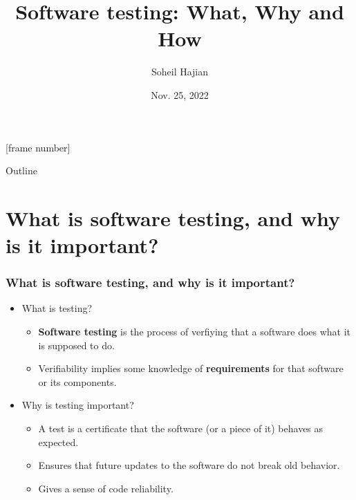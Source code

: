 \documentclass[9pt,xcolor=dvipsnames]{beamer}
\begin{document}
%
\date{Nov. 25, 2022}

\author[S. Hajian]{
	{Soheil Hajian}
	}
%

[frame number]
%
\title[]{Software testing: What, Why and How}

%
%
%
\begin{frame}[plain]

\begin{titlepage}
\end{titlepage}
\vfill
\end{frame}

\begin{frame}{Outline}
    \tableofcontents
\end{frame}
%

\section{What is software testing, and why is it important?}
\begin{frame}
  \frametitle{What is software testing, and why is it important?}
  \begin{itemize}
  \item What is testing?
    \begin{itemize}
    \item \textbf{Software testing} is the process of verfiying that a
      software does what it is supposed to do.
    \item Verifiability implies some knowledge of \textbf{requirements} for that software
      or its components.
    \end{itemize}
    \pause 
  \item Why is testing important?
    \begin{itemize}
      \item A test is a certificate that the software (or a piece of
        it) behaves as expected.
      \item Ensures that future updates to the software do not break
        old behavior.
      \item Gives a sense of code reliability. 
    \end{itemize}
  \end{itemize}

\end{frame}
\end{document}
